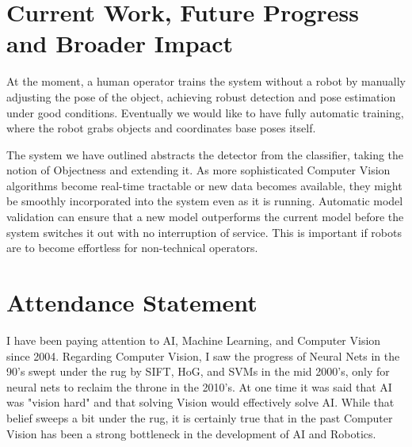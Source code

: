 \documentclass[12pt]{article}
\numberwithin{equation}{section}
\numberwithin{table}{section}
\numberwithin{figure}{section}
\begin{document}

\section{Current Work, Future Progress and Broader Impact}
At the moment, a human operator trains the system without a robot by manually adjusting the pose of the object, 
achieving robust detection and pose estimation under good conditions. Eventually we would like to have 
fully automatic training, where the robot grabs objects and coordinates base poses itself.

The system we have outlined abstracts the detector from the classifier, taking the notion of Objectness and
extending it. As more sophisticated Computer Vision algorithms become real-time tractable or new data becomes
available, they might be smoothly incorporated into the system even as it is running. 
Automatic model validation can ensure that a new model outperforms the current model before the system switches 
it out with no interruption of service. This is important if robots are
to become effortless for non-technical operators.


\newpage




\newpage

\section{Attendance Statement}

  I have been paying attention to AI, Machine Learning, and Computer Vision since 2004. 
Regarding Computer Vision, I saw the progress of Neural Nets in the 90's swept under 
the rug by SIFT, HoG, and SVMs in the mid 2000's, only for neural nets to reclaim the throne in the 2010's.
At one time it was said that AI was "vision hard" and that solving Vision would
effectively solve AI. While that belief sweeps a bit under the rug, it is certainly true
that in the past Computer Vision has been a strong bottleneck in the development of AI and 
Robotics. 
  
\end{document}
